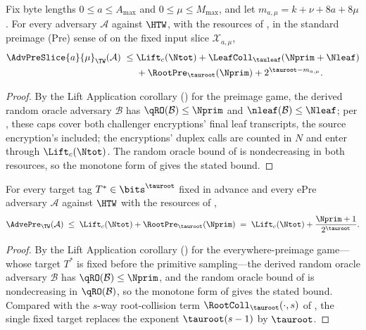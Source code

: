 \begin{theorem}
\label{thm:pre}
Fix byte lengths $0 \leq a \leq A_{\max}$ and
$0 \leq \mu \leq M_{\max}$, and let
$m_{a,\mu}=k+\nu+8a+8\mu$. For every adversary $\mathcal{A}$ against
$\HTW$, with the resources of , in the standard
preimage (Pre) sense of \cite{RS04} on the fixed input slice
$\mathcal{X}_{a,\mu}$,
\[
\begin{aligned}
  \AdvPreSlice{a}{\mu}_\TW(\mathcal{A})
  \;\leq\;&
  \Lift_c(\Ntot)
  + \LeafColl_{\tauleaf}(\Nprim+\Nleaf) \\
  &+ \RootPre_{\tauroot}(\Nprim)
  + 2^{\tauroot - m_{a,\mu}}.
\end{aligned}
\]
\end{theorem}

\begin{proof}
By the Lift Application corollary () for the
preimage game, the derived random oracle adversary $\mathcal{B}$ has
$\qRO(\mathcal{B}) \leq \Nprim$ and
$\nleaf(\mathcal{B}) \leq \Nleaf$; per , these caps
cover both challenger encryptions' final leaf transcripts, the source
encryption's included; the encryptions' duplex calls are counted in $N$
and enter through $\Lift_c(\Ntot)$. The random oracle bound of
 is nondecreasing in both resources, so the monotone form
of  gives the stated bound.
\end{proof}

\begin{theorem}
\label{thm:epre}
For every target tag $T^* \in \bits^{\tauroot}$ fixed in advance and every
ePre adversary $\mathcal{A}$ against $\HTW$ with the resources of
,
\[
  \AdvePre_\TW(\mathcal{A})
  \;\leq\;
  \Lift_c(\Ntot) + \RootPre_{\tauroot}(\Nprim)
  \;=\;
  \Lift_c(\Ntot) + \frac{\Nprim + 1}{2^{\tauroot}}.
\]
\end{theorem}

\begin{proof}
By the Lift Application corollary () for the
everywhere-preimage game---whose target $T^*$ is fixed before the
primitive
sampling---the derived random oracle adversary $\mathcal{B}$ has
$\qRO(\mathcal{B}) \leq \Nprim$, and the random oracle bound of
 is nondecreasing in $\qRO(\mathcal{B})$, so the monotone
form of  gives the stated bound. Compared with the
$s$-way root-collision term $\RootColl_{\tauroot}(\cdot, s)$ of
, the single fixed target replaces the exponent
$\tauroot(s-1)$ by $\tauroot$.
\end{proof}

